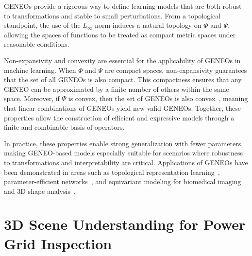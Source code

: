GENEOs provide a rigorous way to define learning models that are both robust to
transformations and stable to small perturbations. From a topological
standpoint, the use of the $L_\infty$ norm induces a natural topology on $\Phi$
and $\Psi$, allowing the spaces of functions to be treated as compact metric
spaces under reasonable conditions.

Non-expansivity and convexity are essential for the applicability of GENEOs in
machine learning. When $\Phi$ and $\Psi$ are compact spaces, non-expansivity
guarantees that the set of all GENEOs is also compact. This compactness ensures
that any GENEO can be approximated by a finite number of others within the same
space. Moreover, if $\Psi$ is convex, then the set of GENEOs is also
convex~\cite{bergomi2019towards}, meaning that linear combinations of GENEOs
yield new valid GENEOs. Together, these properties allow the construction of
efficient and expressive models through a finite and combinable basis of
operators.

In practice, these properties enable strong generalization with fewer
parameters, making GENEO-based models especially suitable for scenarios where
robustness to transformations and interpretability are critical. Applications
of GENEOs have been demonstrated in areas such as topological representation
learning~\cite{bergomi2019towards}, parameter-efficient
networks~\cite{bocchi2023finite}, and equivariant modeling for biomedical
imaging and 3D shape analysis~\cite{bocchi2022geneonet}.

\section{3D Scene Understanding for Power Grid Inspection}\label{sec:3d_scene_understanding_power_grid}


